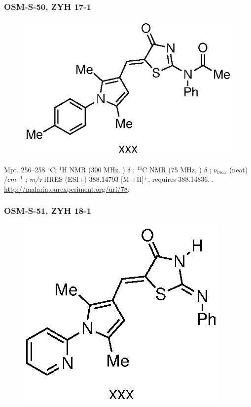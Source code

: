 \documentclass[12pt, a4paper,titlepage]{article}
\begin{document}
{\subsubsection*{OSM-S-50, ZYH 17-1}
\label{exp:ZYH17}
	\begin{figure}[H]
	\begin{center}
	\includegraphics{exp/ZYH17.eps}
	\end{center}
	\vspace{-25pt}	
	\end{figure}

Mpt. 256--258 $^\circ$C; 
$^1$H NMR (300 MHz, ) $\delta$ ; 
  $^{13}$C NMR (75 MHz, ) $\delta$ ; 
 $\nu_{max}$ (neat) /$cm^{-1}$ ; 
\emph{m/z} HRES (ESI+) 388.14793 [M-+H]$^+$,  requires 388.14836.
. 
\url{http://malaria.ourexperiment.org/uri/78}. 

\subsubsection*{OSM-S-51, ZYH 18-1}
\label{exp:ZYH18}
\begin{figure}[H]
	\begin{center}
	\includegraphics{exp/ZYH18.eps}
	\end{center}
	\vspace{-25pt}	
	\end{figure}


}
\end{document}
